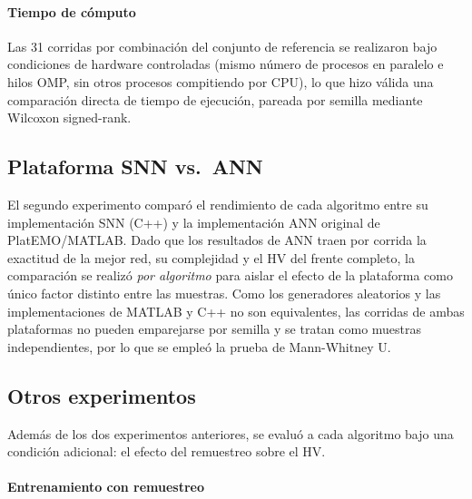 \paragraph{Tiempo de cómputo}

Las 31 corridas por combinación del conjunto de referencia se realizaron bajo condiciones de hardware controladas (mismo número de procesos en paralelo e hilos OMP, sin otros procesos compitiendo por CPU), lo que hizo válida una comparación directa de tiempo de ejecución, pareada por semilla mediante Wilcoxon signed-rank.

\subsection{Plataforma SNN vs.\ ANN}\label{sec:metodologia-estudio2}

El segundo experimento comparó el rendimiento de cada algoritmo entre su implementación SNN (C++) y la implementación ANN original de PlatEMO/MATLAB. Dado que los resultados de ANN traen por corrida la exactitud de la mejor red, su complejidad y el HV del frente completo, la comparación se realizó \emph{por algoritmo} para aislar el efecto de la plataforma como único factor distinto entre las muestras. Como los generadores aleatorios y las implementaciones de MATLAB y C++ no son equivalentes, las corridas de ambas plataformas no pueden emparejarse por semilla y se tratan como muestras independientes, por lo que se empleó la prueba de Mann-Whitney U.

\subsection{Otros experimentos}\label{sec:metodologia-otros}

Además de los dos experimentos anteriores, se evaluó a cada algoritmo bajo una condición adicional: el efecto del remuestreo sobre el HV.

\paragraph{Entrenamiento con remuestreo}

